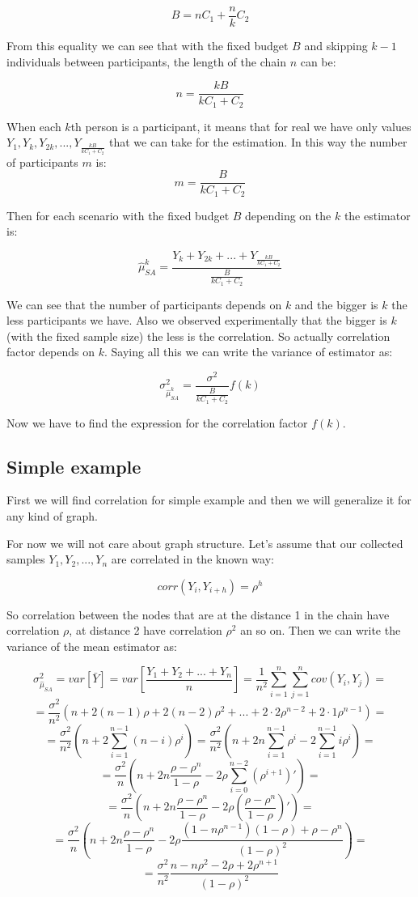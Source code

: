 \documentclass[12pt]{report}
\begin{document}
$$B = nC_1 + \frac{n}{k}C_2$$

From this equality we can see that with the fixed budget $B$ and skipping $k-1$ individuals between participants, the length of the chain $n$ can be:

$$n = \frac{kB}{kC_1 + C_2}$$

When each $k$th person is a participant, it means that for real we have only values $Y_1, Y_k, Y_{2k}, ..., Y_{\frac{kB}{kC_1 + C_2}}$ that we can take for the estimation. In this way the number of participants $m$ is:
$$m = \frac{B}{kC_1 + C_2}$$

Then for each scenario with the fixed budget $B$ depending on the $k$ the estimator is:

$$ \widehat{\mu}_{SA}^k = \frac{Y_k+ Y_{2k}+ ...+ Y_{\frac{kB}{kC_1 + C_2}}}{\frac{B}{kC_1 + C_2}}$$


We can see that the number of participants depends on $k$ and the bigger is $k$ the less participants we have.
Also we observed experimentally that the bigger is $k$ (with the fixed sample size) the less is the correlation. So actually correlation factor  depends on $k$.
Saying all this we can write the variance of estimator as:

$$ \sigma^2_{\hat{\mu}_{SA}^k} = \frac{\sigma^2}{\frac{B}{kC_1 + C_2}} f(k)$$


Now we have to find the expression for the correlation factor $f(k)$.

\subsection{Simple example}

First we will find correlation for simple example and then we will generalize it for any kind of graph.

For now we will not care about graph structure. Let's assume that our collected samples $Y_1, Y_2, ..., Y_n$ are correlated in the known way:

 $$corr(Y_i, Y_{i+h}) = \rho^h$$

So correlation between the nodes that are at the distance 1 in the chain have correlation $\rho$, at distance 2 have correlation $\rho^2$ an so on. 
Then we can write the variance of the mean estimator as: 

$$\sigma^2_{\hat{\mu}_{SA}} = var\left[\bar{Y} \right] = var\left[ \frac{Y_1 + Y_2 + ...+ Y_n}{n} \right] = \frac{1}{n^2} \sum_{i=1}^{n}\sum_{j=1}^{n} cov(Y_i, Y_j) =$$ 
$$ = \frac{\sigma^2}{n^2} \left( n + 2(n-1)\rho + 2(n-2)\rho^2 + ... + 2\cdot2 \rho^{n-2}+ 2\cdot1 \rho^{n-1} \right) = $$
$$ = \frac{\sigma^2}{n^2} \left(n + 2\sum_{i=1}^{n-1} (n-i)\rho^i \right) = \frac{\sigma^2}{n^2} \left(n + 2n\sum_{i=1}^{n-1}\rho^i - 2\sum_{i=1}^{n-1}i\rho^i \right) = $$
$$ = \frac{\sigma^2}{n} \left(n + 2n\frac{\rho-\rho^{n}}{1-\rho} - 2\rho \sum_{i=0}^{n-2} (\rho^{i+1})' \right) = $$
$$ = \frac{\sigma^2}{n} \left(n + 2n\frac{\rho-\rho^{n}}{1-\rho} - 2\rho\left(\frac{\rho-\rho^n}{1-\rho}\right)' \right) = $$
$$ = \frac{\sigma^2}{n} \left(n + 2n\frac{\rho-\rho^{n}}{1-\rho} - 2\rho \frac{(1-n\rho^{n-1})(1-\rho) + \rho - \rho^n}{(1-\rho)^2} \right) = $$
$$ = \frac{\sigma^2}{n^2} \frac{n-n\rho^2 - 2\rho + 2\rho^{n+1}}{(1-\rho)^2}$$
\end{document}
